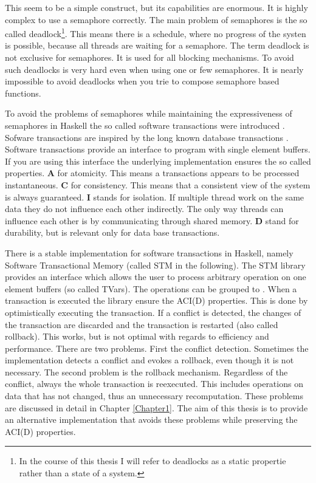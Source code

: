 This seem to be a simple construct, but its capabilities are enormous. It is highly complex to use a semaphore correctly.
The main problem of semaphores is the so called deadlock\footnote{In the course of this thesis I will refer to deadlocks as a static propertie rather than a state of a system.}. 
This means there is a schedule, where no progress of the systen is possible, because all threads are waiting for a semaphore. The term deadlock is not exclusive for semaphores.
It is used for all blocking mechanisms. To avoid such deadlocks is very hard even when using one or few semaphores. 
It is nearly impossible to avoid deadlocks when you trie to compose semaphore based functions.

To avoid the problems of semaphores while maintaining the expressiveness of semaphores in Haskell the so called software transactions were introduced \parencite{STMBase}.
Sofware transactions are inspired by the long known database transactions \parencite{DBTrans}. Software transactions provide an interface to program with 
single element buffers. If you are using this interface the underlying implementation ensures the so called  properties. \textbf{A} for atomicity.
This means a transactions appears to be processed instantaneous. \textbf{C} for consistency. This means that a consistent view of the system is always guaranteed.
\textbf{I} stands for isolation. If multiple thread work on the same data they do not influence each other indirectly. The only way threads can influence each other 
is by communicating through shared memory.
\textbf{D} stand for durability, but is relevant only for data base transactions. 

There is a stable implementation for software transactions in Haskell, namely Software Transactional Memory (called STM in the following). The STM library provides 
an interface which allows the user to process arbitrary operation on one element buffers (so called TVars). The operations can be grouped to .
When a transaction is executed the library ensure the ACI(D) properties. This is done by optimistically executing the transaction.  
If a conflict is detected, the changes of the transaction are discarded and the transaction is restarted (also called rollback). 
This works, but is not optimal with regards to efficiency and performance. There are two problems. First the conflict detection. Sometimes the implementation detects 
a conflict and evokes a rollback, even though it is not necessary. The second problem is the rollback mechanism. Regardless of the conflict, always the whole transaction
is reexecuted. This includes operations on data that has not changed, thus an unnecessary recomputation. These problems are discussed in detail in Chapter \ref{Chapter1}. 
The aim of this thesis is to provide an alternative implementation that avoids these problems while preserving the ACI(D) properties.
